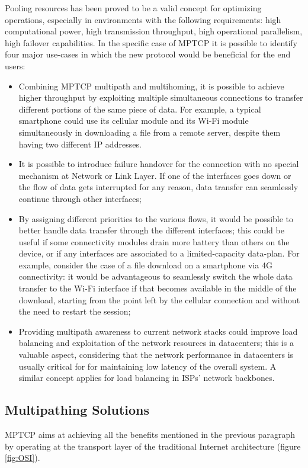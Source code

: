 Pooling resources has been proved to be a valid concept for optimizing operations, especially in environments with the following requirements: high computational power, high transmission throughput, high operational parallelism, high failover capabilities. 
In the specific case of MPTCP it is possible to identify four major use-cases in which the new protocol would be beneficial for the end users:
\begin{itemize}
  \item Combining MPTCP multipath and multihoming, it is possible to achieve higher throughput by exploiting multiple simultaneous connections to transfer different portions of the same piece of data. For example, a typical smartphone could use its cellular module and its Wi-Fi module simultaneously in downloading a file from a remote server, despite them having two different IP addresses.
  \item It is possible to introduce failure handover for the connection with no special mechanism at Network or Link Layer. If one of the interfaces goes down or the flow of data gets interrupted for any reason, data transfer can seamlessly continue through other interfaces;
  \item By assigning different priorities to the various flows, it would be possible to better handle data transfer through the different interfaces; this could be useful if some connectivity modules drain more battery than others on the device, or if any interfaces are associated to a limited-capacity data-plan. For example, consider the case of a file download on a smartphone via 4G connectivity: it would be advantageous to seamlessly switch the whole data transfer to the Wi-Fi interface if that becomes available in the middle of the download, starting from the point left by the cellular connection and without the need to restart the session;
  \item Providing multipath awareness to current network stacks could improve load balancing and exploitation of the network resources in datacenters; this is a valuable aspect, considering that the network performance in datacenters is usually critical for for maintaining low latency of the overall system. A similar concept applies for load balancing in ISPs' network backbones.
\end{itemize}

\subsection{Multipathing Solutions}
\vspace{5mm}
MPTCP aims at achieving all the benefits mentioned in the previous paragraph by operating at the transport layer of the traditional Internet architecture (figure \ref{fig:OSI}).

